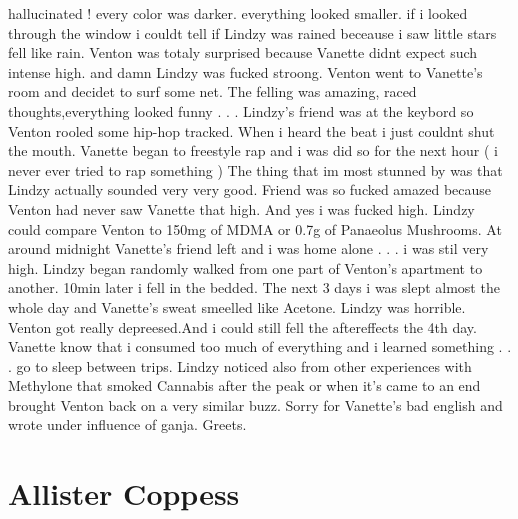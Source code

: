 \documentclass[12pt]{book}
\begin{document}
hallucinated ! every color was darker. everything looked smaller. if i looked through the window i couldt tell if Lindzy was rained beceause i saw little stars fell like rain. Venton was totaly surprised because Vanette didnt expect such intense high. and damn Lindzy was fucked stroong. Venton went to Vanette's room and decidet to surf some net. The felling was amazing, raced thoughts,everything looked funny . . .  Lindzy's friend was at the keybord so Venton rooled some hip-hop tracked. When i heard the beat i just couldnt shut the mouth. Vanette began to freestyle rap and i was did so for the next hour (  i never ever tried to rap something ) The thing that im most stunned by was that Lindzy actually sounded very very good. Friend was so fucked amazed because Venton had never saw Vanette that high. And yes i was fucked high. Lindzy could compare Venton to 150mg of MDMA or 0.7g of Panaeolus Mushrooms. At around midnight Vanette's friend left and i was home alone . . .  i was stil very high. Lindzy began randomly walked from one part of Venton's apartment to another. 10min later i fell in the bedded. The next 3 days i was slept almost the whole day and Vanette's sweat smeelled like Acetone. Lindzy was horrible. Venton got really depreesed.And i could still fell the aftereffects the 4th day. Vanette know that i consumed too much of everything and i learned something . . .  go to sleep between trips. Lindzy noticed also from other experiences with Methylone that smoked Cannabis after the peak or when it's came to an end brought Venton back on a very similar buzz. Sorry for Vanette's bad english and wrote under influence of ganja. Greets.



\chapter{Allister Coppess}
\end{document}
